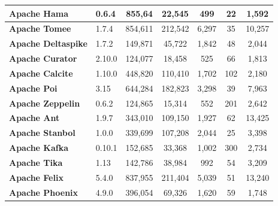 \begin{landscape}
\begin{table}[htbp]
\begin{adjustbox}{width=1.3\textwidth}
\begin{tabular}{l|l|c|c|c|c|c}
			\textbf{Apache Hama}       & 0.6.4            &           855,64           &           22,545           &        499        &           22           &        1,592         \\ \hline
			\textbf{Apache Tomee}      & 1.7.4            &          854,611           &          212,542           &       6,297        &           35           &        10,257        \\ \hline
			\textbf{Apache Deltaspike} & 1.7.2            &          149,871           &           45,722           &       1,842        &           48           &        2,044         \\ \hline
			\textbf{Apache Curator}    & 2.10.0           &          124,077           &           18,458           &        525        &           66           &        1,813         \\ \hline
			\textbf{Apache Calcite}    & 1.10.0           &          448,820           &          110,410           &       1,702        &          102           &        2,180         \\ \hline
			\textbf{Apache Poi}        & 3.15             &          644,284           &          182,823           &       3,298        &           39           &        7,963         \\ \hline
			\textbf{Apache Zeppelin}   & 0.6.2            &          124,865           &           15,314           &        552        &          201           &        2,642         \\ \hline
			\textbf{Apache Ant}        & 1.9.7            &          343,010           &          109,150           &       1,927        &           62           &        13,425        \\ \hline
			\textbf{Apache Stanbol}    & 1.0.0            &          339,699           &          107,208           &       2,044        &           25           &        3,398         \\ \hline
			\textbf{Apache Kafka}      & 0.10.1           &          152,685           &           33,368           &       1,002        &          300           &        2,734         \\ \hline
			\textbf{Apache Tika}       & 1.13             &          142,786           &           38,984           &        992        &           54           &        3,209         \\ \hline
			\textbf{Apache Felix}      & ‎5.4.0           &          837,955           &          211,404           &       5,039        &           51           &        13,240        \\ \hline
			\textbf{Apache Phoenix}    & 4.9.0            &          396,054           &           69,326           &       1,620        &           59           &        1,748         \\ \hline
		\end{tabular}
		\label{table:ch4_projects_statistics}


\end{adjustbox}
\end{table}
\end{landscape}
